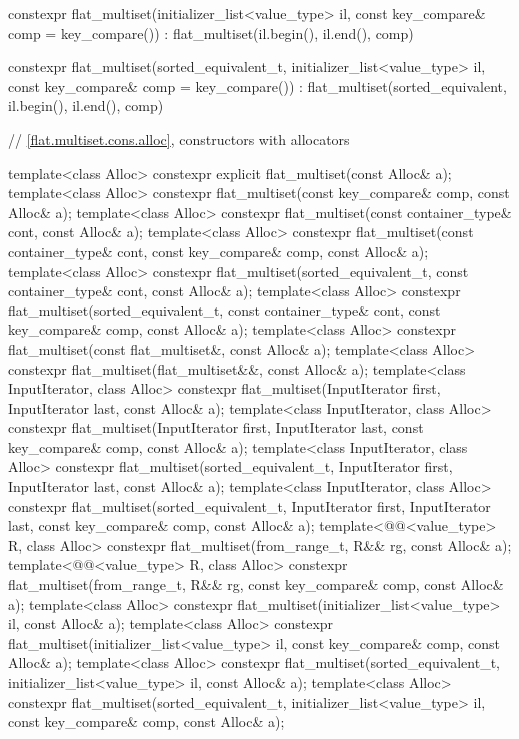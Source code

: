 \begin{codeblock}
{{    constexpr flat_multiset(initializer_list<value_type> il,
                            const key_compare& comp = key_compare())
      : flat_multiset(il.begin(), il.end(), comp) { }

    constexpr flat_multiset(sorted_equivalent_t, initializer_list<value_type> il,
                            const key_compare& comp = key_compare())
        : flat_multiset(sorted_equivalent, il.begin(), il.end(), comp) { }

    // \ref{flat.multiset.cons.alloc}, constructors with allocators

    template<class Alloc>
      constexpr explicit flat_multiset(const Alloc& a);
    template<class Alloc>
      constexpr flat_multiset(const key_compare& comp, const Alloc& a);
    template<class Alloc>
      constexpr flat_multiset(const container_type& cont, const Alloc& a);
    template<class Alloc>
      constexpr flat_multiset(const container_type& cont, const key_compare& comp,
                              const Alloc& a);
    template<class Alloc>
      constexpr flat_multiset(sorted_equivalent_t, const container_type& cont, const Alloc& a);
    template<class Alloc>
      constexpr flat_multiset(sorted_equivalent_t, const container_type& cont,
                              const key_compare& comp, const Alloc& a);
    template<class Alloc>
      constexpr flat_multiset(const flat_multiset&, const Alloc& a);
    template<class Alloc>
      constexpr flat_multiset(flat_multiset&&, const Alloc& a);
    template<class InputIterator, class Alloc>
      constexpr flat_multiset(InputIterator first, InputIterator last, const Alloc& a);
    template<class InputIterator, class Alloc>
      constexpr flat_multiset(InputIterator first, InputIterator last,
                              const key_compare& comp, const Alloc& a);
    template<class InputIterator, class Alloc>
      constexpr flat_multiset(sorted_equivalent_t, InputIterator first, InputIterator last,
                              const Alloc& a);
    template<class InputIterator, class Alloc>
      constexpr flat_multiset(sorted_equivalent_t, InputIterator first, InputIterator last,
                              const key_compare& comp, const Alloc& a);
    template<@@<value_type> R, class Alloc>
      constexpr flat_multiset(from_range_t, R&& rg, const Alloc& a);
    template<@@<value_type> R, class Alloc>
      constexpr flat_multiset(from_range_t, R&& rg, const key_compare& comp, const Alloc& a);
    template<class Alloc>
      constexpr flat_multiset(initializer_list<value_type> il, const Alloc& a);
    template<class Alloc>
      constexpr flat_multiset(initializer_list<value_type> il, const key_compare& comp,
                              const Alloc& a);
    template<class Alloc>
      constexpr flat_multiset(sorted_equivalent_t, initializer_list<value_type> il,
                              const Alloc& a);
    template<class Alloc>
      constexpr flat_multiset(sorted_equivalent_t, initializer_list<value_type> il,
                              const key_compare& comp, const Alloc& a);

}}
\end{codeblock}
